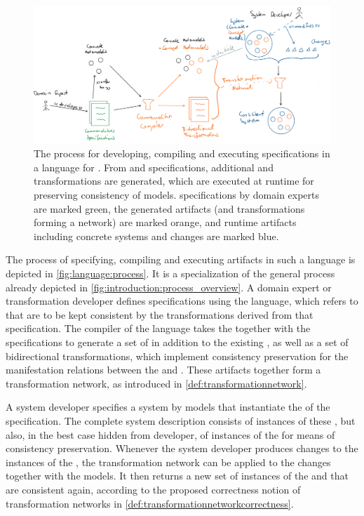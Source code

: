 \begin{figure}
    \centering
    \includegraphics[width=\textwidth]{figures/quality/language/overall_process.png}
    \caption[Process and artifacts using a language for \commonalities]{The process for developing, compiling and executing specifications in a language for \commonalities. From \concretemetamodels and \commonalities specifications, additional \conceptmetamodels and transformations are generated, which are executed at runtime for preserving consistency of models.
    \Commonalities specifications by domain experts are marked green, the generated artifacts (\conceptmetamodels and transformations forming a network) are marked orange, and runtime artifacts including concrete systems and changes are marked blue.}
    \label{fig:language:process}
\end{figure}

The process of specifying, compiling and executing artifacts in such a language is depicted in \autoref{fig:language:process}.
It is a specialization of the general process already depicted in \autoref{fig:introduction:process_overview}.
A domain expert or transformation developer defines \commonalities specifications using the language, which refers to \concretemetamodels that are to be kept consistent by the transformations derived from that specification.
The compiler of the language takes the \concretemetamodels together with the specifications to generate a set of \conceptmetamodels in addition to the existing \concretemetamodels, as well as a set of bidirectional transformations, which implement consistency preservation for the manifestation relations between the \conceptmetamodels and \concretemetamodels.
These artifacts together form a transformation network, as introduced in \autoref{def:transformationnetwork}.

A system developer specifies a system by models that instantiate the \concretemetamodels of the \commonalities specification.
The complete system description consists of instances of these \concretemetamodels, but also, in the best case hidden from developer, of instances of the \conceptmetamodels for means of consistency preservation.
Whenever the system developer produces changes to the instances of the \concretemetamodels, the transformation network can be applied to the changes together with the models.
It then returns a new set of instances of the \concretemetamodel and \conceptmetamodels that are consistent again, according to the proposed correctness notion of transformation networks in \autoref{def:transformationnetworkcorrectness}.



